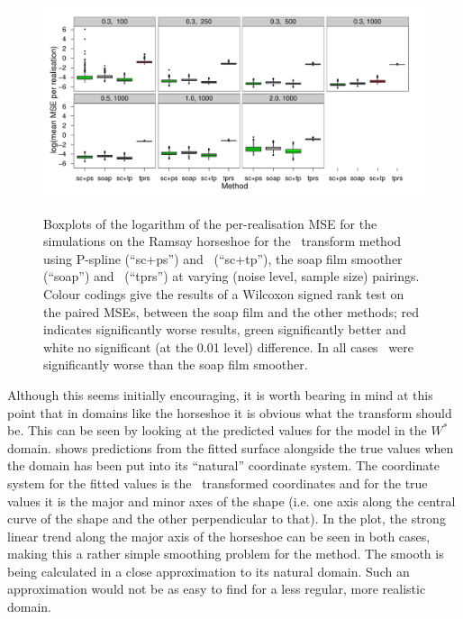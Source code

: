 \begin{figure}
\centering
\includegraphics{sc/tablecode/ramsay-boxplot.pdf} \\
\caption{Boxplots of the logarithm of the per-realisation MSE for the simulations on the Ramsay horseshoe for the \sch\ transform method using P-spline (``sc+ps'') and \tprss\ (``sc+tp''), the soap film smoother (``soap'') and \tprss\ (``tprs'') at varying (noise level, sample size) pairings. Colour codings give the results of a Wilcoxon signed rank test on the paired MSEs, between the soap film and the other methods; red indicates significantly worse results, green significantly better and white no significant (at the 0.01 level) difference. In all cases \tprss\ were significantly worse than the soap film smoother.}
\label{sc-ram-boxplot}
\end{figure}


Although this seems initially encouraging, it is worth bearing in mind at this point that in domains like the horseshoe it is obvious what the transform should be. This can be seen by looking at the predicted values for the model in the $W^*$ domain.  shows predictions from the fitted surface alongside the true values when the domain has been put into its ``natural'' coordinate system. The coordinate system for the fitted values is the \sch\ transformed coordinates and for the true values it is the major and minor axes of the shape (i.e. one axis along the central curve of the shape and the other perpendicular to that). In the plot, the strong linear trend along the major axis of the horseshoe can be seen in both cases, making this a rather simple smoothing problem for the method. The smooth is being calculated in a close approximation to its natural domain. Such an approximation would not be as easy to find for a less regular, more realistic domain.

